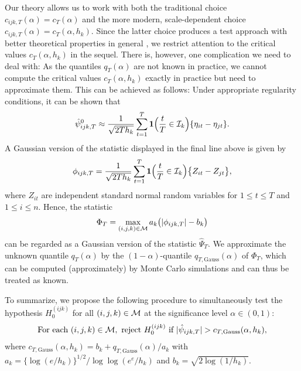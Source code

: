 \documentclass[a4paper,12pt]{article}
\numberwithin{equation}{section}
\begin{document}
Our theory allows us to work with both the traditional choice $c_{ijk,T}(\alpha) = c_T(\alpha)$ and the more modern, scale-dependent choice $c_{ijk,T}(\alpha) = c_T(\alpha,h_k)$. Since the latter choice produces a test approach with better theoretical properties in general {\color{red}\citep[see][]{DuembgenSpokoiny2001}}, we restrict attention to the critical values $c_T(\alpha,h_k)$ in the sequel. There is, however, one complication we need to deal with: As the quantiles $q_T(\alpha)$ are not known in practice, we cannot compute the critical values $c_T(\alpha,h_k)$ exactly in practice but need to approximate them. This can be achieved as follows: Under appropriate regularity conditions, it can be shown that {\color{red} 
\begin{align*}
\hat{\psi}_{ijk,T}^0 
  \approx \frac{1}{\sqrt{2Th_k}} \sum\limits_{t=1}^T \boldsymbol{1}\Big(\frac{t}{T} \in \mathcal{I}_k\Big) \{ \eta_{it} - \eta_{jt} \}.
\end{align*} 
}
A Gaussian version of the statistic displayed in the final line above is given by 
\begin{equation*}
\phi_{ijk,T} = \frac{1}{\sqrt{2Th_k}} \sum\limits_{t=1}^T \boldsymbol{1}\Big(\frac{t}{T} \in \mathcal{I}_k\Big) \big\{ Z_{it} - Z_{jt} \big\},
\end{equation*}
where $Z_{it}$ are independent standard normal random variables for $1 \le t \le T$ and $1 \le i \le n$. Hence, the statistic 
\[ \Phi_T = \max_{(i,j,k) \in \mathcal{M}} a_k \big( |\phi_{ijk,T}| - b_k \big) \]
can be regarded as a Gaussian version of the statistic $\hat{\Psi}_T$. We approximate the unknown quantile $q_T(\alpha)$ by the $(1-\alpha)$-quantile $q_{T,\text{Gauss}}(\alpha)$ of $\Phi_T$, which can be computed (approximately) by Monte Carlo simulations and can thus be treated as known. 


To summarize, we propose the following procedure to simultaneously test the hypothesis $H_0^{(ijk)}$ for all $(i,j,k) \in \mathcal{M}$ at the significance level $\alpha \in (0,1)$: 
\begin{equation}\label{eq:test}
\text{For each } (i,j,k) \in \mathcal{M}, \text{ reject } H_0^{(ijk)} \text{ if } |\hat{\psi}_{ijk,T}| > c_{T,\text{Gauss}}(\alpha,h_k),
\end{equation}
where $c_{T,\text{Gauss}}(\alpha,h_k) = b_k + q_{T,\text{Gauss}}(\alpha)/a_k$ with $a_k = \{\log(e/h_k)\}^{1/2} / \log \log(e^e / h_k)$ and $b_k = \sqrt{2 \log(1/h_k)}$. 
\end{document}
